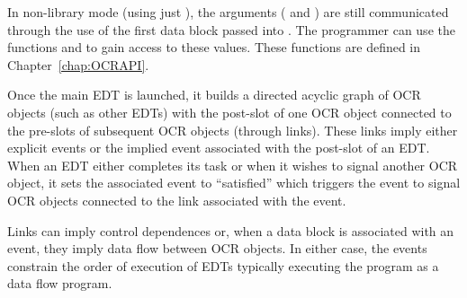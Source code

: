 In non-library mode (using just ), the arguments
( and ) are still communicated through the use
of the first data block passed into . The programmer can
use the functions  and  to gain access to
these values. These functions are defined in Chapter~\ref{chap:OCRAPI}.

Once the main EDT is launched, it builds a directed acyclic graph of
OCR objects (such as other EDTs) with the post-slot of one OCR object
connected to the pre-slots of subsequent OCR objects (through
links). These links imply either explicit events or the implied event
associated with the post-slot of an EDT. When an EDT either completes
its task or when it wishes to signal another OCR object, it sets the
associated event to ``satisfied'' which triggers the event to signal
OCR objects connected to the link associated with the event.

Links can imply control dependences or, when a data block is
associated with an event, they imply data flow between OCR objects.
In either case, the events constrain the order of execution of EDTs
typically executing the program as a data flow program.

